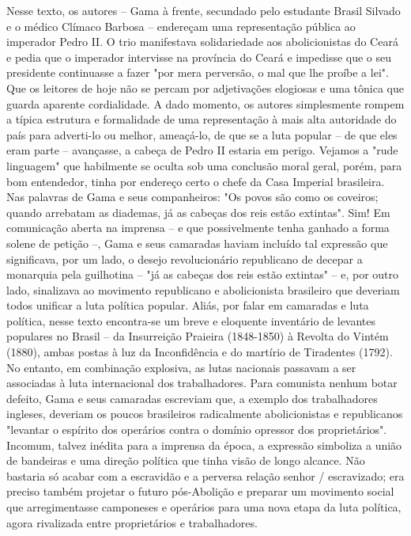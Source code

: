 {{\small\noindent
Nesse texto, os autores -- Gama à frente, secundado pelo estudante
Brasil Silvado e o médico Clímaco Barbosa -- endereçam uma representação
pública ao imperador Pedro II. O trio manifestava solidariedade aos
abolicionistas do Ceará e pedia que o imperador intervisse na província
do Ceará e impedisse que o seu presidente continuasse a fazer "por mera
perversão, o mal que lhe proíbe a lei". Que os leitores de hoje não se
percam por adjetivações elogiosas e uma tônica que guarda aparente
cordialidade. A dado momento, os autores simplesmente rompem a típica
estrutura e formalidade de uma representação à mais alta autoridade do
país para adverti-lo ou melhor, ameaçá-lo, de que se a luta popular --
de que eles eram parte -- avançasse, a cabeça de Pedro II estaria em
perigo. Vejamos a "rude linguagem" que habilmente se oculta sob uma
conclusão moral geral, porém, para bom entendedor, tinha por endereço
certo o chefe da Casa Imperial brasileira. Nas palavras de Gama e seus
companheiros: "Os povos são como os coveiros; quando arrebatam as
diademas, já as cabeças dos reis estão extintas". Sim! Em comunicação
aberta na imprensa -- e que possivelmente tenha ganhado a forma solene
de petição --, Gama e seus camaradas haviam incluído tal expressão que
significava, por um lado, o desejo revolucionário republicano de decepar
a monarquia pela guilhotina -- "já as cabeças dos reis estão extintas"
-- e, por outro lado, sinalizava ao movimento republicano e
abolicionista brasileiro que deveriam todos unificar a luta política
popular. Aliás, por falar em camaradas e luta política, nesse texto
encontra-se um breve e eloquente inventário de levantes populares no
Brasil -- da Insurreição Praieira (1848-1850) à Revolta do Vintém
(1880), ambas postas à luz da Inconfidência e do martírio de Tiradentes
(1792). No entanto, em combinação explosiva, as lutas nacionais passavam
a ser associadas à luta internacional dos trabalhadores. Para comunista
nenhum botar defeito, Gama e seus camaradas escreviam que, a exemplo dos
trabalhadores ingleses, deveriam os poucos brasileiros radicalmente
abolicionistas e republicanos "levantar o espírito dos operários contra
o domínio opressor dos proprietários". Incomum, talvez inédita para a
imprensa da época, a expressão simboliza a união de bandeiras e uma
direção política que tinha visão de longo alcance. Não bastaria só
acabar com a escravidão e a perversa relação senhor / escravizado; era
preciso também projetar o futuro pós-Abolição e preparar um movimento
social que arregimentasse camponeses e operários para uma nova etapa da
luta política, agora rivalizada entre proprietários e trabalhadores. }

}
